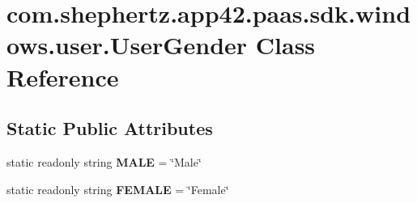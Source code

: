 \hypertarget{classcom_1_1shephertz_1_1app42_1_1paas_1_1sdk_1_1windows_1_1user_1_1_user_gender}{\section{com.\+shephertz.\+app42.\+paas.\+sdk.\+windows.\+user.\+User\+Gender Class Reference}
\label{classcom_1_1shephertz_1_1app42_1_1paas_1_1sdk_1_1windows_1_1user_1_1_user_gender}
}
\subsection*{Static Public Attributes}
\begin{DoxyCompactItemize}
\item 
\hypertarget{classcom_1_1shephertz_1_1app42_1_1paas_1_1sdk_1_1windows_1_1user_1_1_user_gender_ac2bb12e790d6493874831cf551eb37c8}{static readonly string {\bfseries M\+A\+L\+E} = \char`\"{}Male\char`\"{}}\label{classcom_1_1shephertz_1_1app42_1_1paas_1_1sdk_1_1windows_1_1user_1_1_user_gender_ac2bb12e790d6493874831cf551eb37c8}

\item 
\hypertarget{classcom_1_1shephertz_1_1app42_1_1paas_1_1sdk_1_1windows_1_1user_1_1_user_gender_aeb4c3443fb7c0513d12cb51a468ce247}{static readonly string {\bfseries F\+E\+M\+A\+L\+E} = \char`\"{}Female\char`\"{}}\label{classcom_1_1shephertz_1_1app42_1_1paas_1_1sdk_1_1windows_1_1user_1_1_user_gender_aeb4c3443fb7c0513d12cb51a468ce247}

\end{DoxyCompactItemize}
